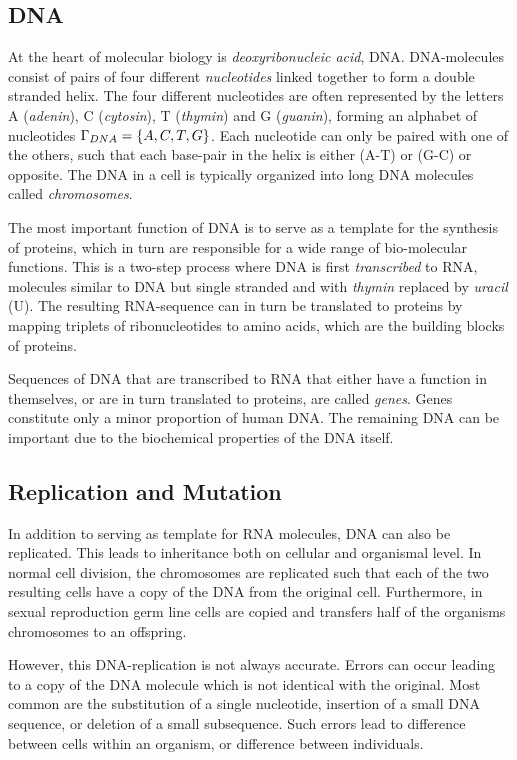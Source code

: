 \subsection{DNA}
At the heart of molecular biology is \emph{deoxyribonucleic acid}, DNA.
DNA-molecules consist of pairs of four different \emph{nucleotides} linked together to form a double stranded helix.
The four different nucleotides are often represented by the letters A (\emph{adenin}), C (\emph{cytosin}), T (\emph{thymin}) and G (\emph{guanin}), forming an alphabet of nucleotides $\Gamma_{DNA} = \left\{A, C, T, G\right\}$.
Each nucleotide can only be paired with one of the others, such that each base-pair in the helix is either (A-T) or (G-C) or opposite. The DNA in a cell is typically organized into long DNA molecules called \emph{chromosomes}. 

The most important function of DNA is to serve as a template for the synthesis of proteins, which in turn are responsible for a wide range of bio-molecular functions.
This is a two-step process where DNA is first \emph{transcribed} to RNA, molecules similar to DNA but single stranded and with \emph{thymin} replaced by \emph{uracil} (U).
The resulting RNA-sequence can in turn be translated to proteins by mapping triplets of ribonucleotides to amino acids, which are the building blocks of proteins.

Sequences of DNA that are transcribed to RNA that either have a function in themselves, or are in turn translated to proteins, are called \emph{genes}.
Genes constitute only a minor proportion of human DNA.
The remaining DNA can be important due to the biochemical properties of the DNA itself. 


\subsection{Replication and Mutation}
In addition to serving as template for RNA molecules, DNA can also be replicated.
This leads to inheritance both on cellular and organismal level.
In normal cell division, the chromosomes are replicated such that each of the two resulting cells have a copy of the DNA from the original cell.
Furthermore, in sexual reproduction germ line cells are copied and transfers half of the organisms chromosomes to an offspring.

However, this DNA-replication is not always accurate.
Errors can occur leading to a copy of the DNA molecule which is not identical with the original.
Most common are the substitution of a single nucleotide, insertion of a small DNA sequence, or deletion of a small subsequence.
Such errors lead to difference between cells within an organism, or difference between individuals.

